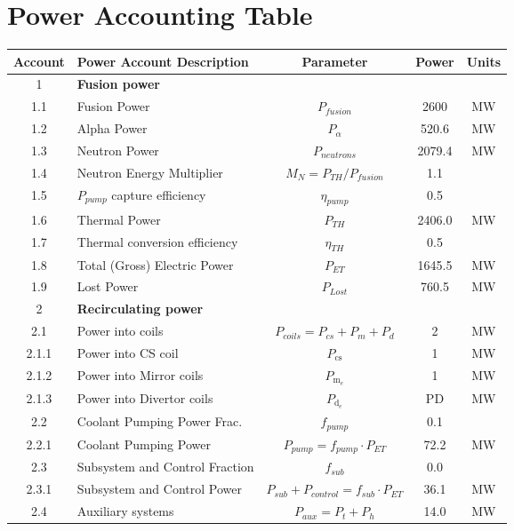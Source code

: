 
\newpage
\section{Power Accounting Table}

\begin{table}[ht!]								
\centering								
\begin{tabular}{|c|p{5cm}|c|c|c|}								
\hline								
\textbf{Account}	&	\textbf{Power Account Description}	&	\textbf{Parameter }	&	\textbf{Power}	&	\textbf{Units} \\
\hline								
1	&	\textbf{Fusion power}	&		&		&	\\
\hline
1.1	&	Fusion Power	&	$P_{{fusion}}$	&	2600	&	MW \\
1.2	&	Alpha Power	&	$P_{{\alpha}}$	&	520.6	&	MW \\
1.3	&	Neutron Power	&	$P_{{neutrons}}$	&	2079.4	&	MW \\
1.4	&	Neutron Energy Multiplier	&	$M_N = P_{{TH}}/P_{{fusion}}$	&	1.1	&	\\
1.5	&	$P_{pump}$ capture efficiency	&	$\eta_{{pump}}$	&	0.5	&	\\
1.6	&	Thermal Power	&	$P_{{TH}}$	&	2406.0	&	MW \\
1.7	&	Thermal conversion efficiency	&	$\eta_{{TH}}$	&	0.5	&	\\
1.8	&	Total (Gross) Electric Power	&	$P_{{ET}}$	&	1645.5	&	MW \\
1.9	&	Lost Power	&	$P_{{Lost}}$	&	760.5	&	MW \\
\hline								
2	&	\textbf{Recirculating power}	&		&		&	\\
\hline
2.1	&	Power into coils 	&	$P_{{coils}} = P_{{cs}} + P_{{m}}+ P_{{d}}$	&	2	&	MW \\
2.1.1 & Power into CS coil & $P_{\text{cs}}$ & 1 & MW \\
2.1.2 & Power into Mirror coils & $P_{\text{m}_e}$ & 1 & MW \\
2.1.3 & Power into Divertor coils & $P_{\text{d}_e}$ & PD & MW \\
2.2	&	Coolant Pumping Power Frac.	&	$f_{{pump}}$	&	0.1 &	\\
2.2.1	&	Coolant Pumping Power	&	$P_{{pump}} = f_{{pump}} \cdot P_{{ET}}$	&	72.2	&	MW \\
2.3	&	Subsystem and Control Fraction	&	$f_{{sub}}$	&	0.0	&	\\
2.3.1	&	Subsystem and Control Power	&	$P_{{sub}} + P_{{control}} = f_{{sub}} \cdot P_{{ET}}$	&	36.1	&	MW \\
2.4	&	Auxiliary systems	&	$P_{{aux}} = P_{{t}} + P_{{h}}$	&	14.0	&	MW \\

\end{tabular}
\end{table}
